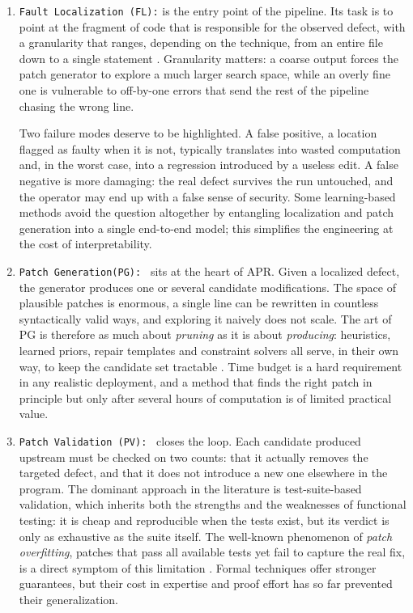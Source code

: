 \begin{enumerate}

\item \texttt{Fault Localization (FL):} is the entry point of the pipeline. Its task is
to point at the fragment of code that is responsible for the observed
defect, with a granularity that ranges, depending on the technique, from
an entire file down to a single statement \citep{wong2016fl-survey}.
Granularity matters: a coarse output forces the patch generator to
explore a much larger search space, while an overly fine one is
vulnerable to off-by-one errors that send the rest of the pipeline
chasing the wrong line.

Two failure modes deserve to be highlighted. A false positive, a
location flagged as faulty when it is not, typically translates into
wasted computation and, in the worst case, into a regression introduced
by a useless edit. A false negative is more damaging: the real defect
survives the run untouched, and the operator may end up with a
false sense of security. Some learning-based methods avoid the question
altogether by entangling localization and patch generation into a single
end-to-end model; this simplifies the engineering at the cost of
interpretability.

\item \texttt{Patch Generation(PG): } sits at the heart of APR. Given a localized
defect, the generator produces one or several candidate modifications.
The space of plausible patches is enormous, a single line can be
rewritten in countless syntactically valid ways, and exploring it
naively does not scale. The art of PG is therefore as much about
\emph{pruning} as it is about \emph{producing}: heuristics, learned
priors, repair templates and constraint solvers all serve, in their own
way, to keep the candidate set tractable \citep{placeholder-pg} . Time
budget is a hard requirement in any realistic deployment, and a method
that finds the right patch in principle but only after several hours of
computation is of limited practical value.

\item \texttt{Patch Validation (PV): } closes the loop. Each candidate produced upstream
must be checked on two counts: that it actually removes the targeted
defect, and that it does not introduce a new one elsewhere in the
program. The dominant approach in the literature is test-suite-based
validation, which inherits both the strengths and the weaknesses of
functional testing: it is cheap and reproducible when the tests exist,
but its verdict is only as exhaustive as the suite itself. The
well-known phenomenon of \emph{patch overfitting}, patches that pass
all available tests yet fail to capture the real fix, is a direct
symptom of this limitation \citep{qi2015overfitting} . Formal techniques
offer stronger guarantees, but their cost in expertise and proof effort
has so far prevented their generalization.

    
\end{enumerate}



